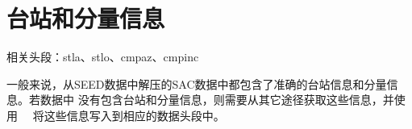 \section{台站和分量信息}
相关头段：stla、stlo、cmpaz、cmpinc

一般来说，从SEED数据中解压的SAC数据中都包含了准确的台站信息和分量信息。若数据中
没有包含台站和分量信息，则需要从其它途径获取这些信息，并使用~~
将这些信息写入到相应的数据头段中。
